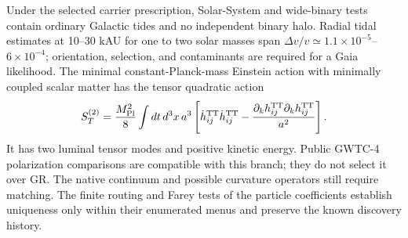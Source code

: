 Under the selected carrier prescription, Solar-System and wide-binary
tests contain ordinary Galactic tides and no independent binary halo.
Radial tidal estimates at 10--30 kAU for one to two solar masses span
$\Delta v/v\simeq1.1\times10^{-5}$--$6\times10^{-4}$; orientation,
selection, and contaminants are required for a Gaia likelihood. The
minimal constant-Planck-mass Einstein action with minimally coupled
scalar matter has the tensor quadratic action
\[
S_T^{(2)}=\frac{M_{\rm Pl}^2}{8}\int dt\,d^3x\,a^3
\left[\dot h_{ij}^{\rm TT}\dot h_{ij}^{\rm TT}
-\frac{\partial_kh_{ij}^{\rm TT}\partial_kh_{ij}^{\rm TT}}{a^2}\right].
\]
It has two luminal tensor modes and positive kinetic energy. Public
GWTC-4 polarization comparisons are compatible with this branch; they
do not select it over GR. The native continuum and possible curvature
operators still require matching. The finite routing and Farey tests of
the particle coefficients establish uniqueness only within their
enumerated menus and preserve the known discovery history.

